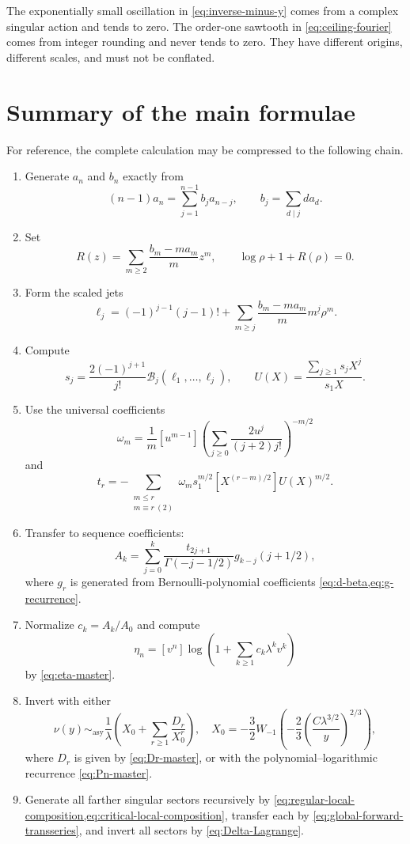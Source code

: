 \documentclass[11pt,a4paper,oneside,openany]{book}
\theoremstyle{definition}
\theoremstyle{remark}
\newcommand{\Bell}[1]{\mathcal B_{#1}}
\newcommand{\falling}[2]{#1^{\underline{#2}}}
\newcommand{\asympseries}{\sim_{\!\mathrm{asy}}}
\begin{document}
\begin{warningbox}[title={Two distinct oscillatory phenomena}]
The exponentially small oscillation in \cref{eq:inverse-minus-y} comes from a
complex singular action and tends to zero.  The order-one sawtooth in
\cref{eq:ceiling-fourier} comes from integer rounding and never tends to zero.
They have different origins, different scales, and must not be conflated.
\end{warningbox}

\chapter{Summary of the main formulae}
\label{ch:summary}

For reference, the complete calculation may be compressed to the following
chain.

\begin{enumerate}
\item Generate $a_n$ and $b_n$ exactly from
\[
 (n-1)a_n=\sum_{j=1}^{n-1}b_ja_{n-j},
 \qquad b_j=\sum_{d\mid j}d a_d.
\]
\item Set
\[
 R(z)=\sum_{m\ge2}\frac{b_m-ma_m}{m}z^m,
 \qquad \log\rho+1+R(\rho)=0.
\]
\item Form the scaled jets
\[
 \ell_j=(-1)^{j-1}(j-1)!+\sum_{m\ge j}
 \frac{b_m-ma_m}{m}\falling mj\rho^m.
\]
\item Compute
\[
 s_j=\frac{2(-1)^{j+1}}{j!}\Bell j(\ell_1,\ldots,\ell_j),
 \qquad U(X)=\frac{\sum_{j\ge1}s_jX^j}{s_1X}.
\]
\item Use the universal coefficients
\[
 \omega_m=\frac1m[u^{m-1}]
 \left(\sum_{j\ge0}\frac{2u^j}{(j+2)j!}\right)^{-m/2}
\]
and
\[
 t_r=-\sum_{\substack{m\le r\\m\equiv r\ (2)}}
 \omega_ms_1^{m/2}[X^{(r-m)/2}]U(X)^{m/2}.
\]
\item Transfer to sequence coefficients:
\[
 A_k=\sum_{j=0}^k
 \frac{t_{2j+1}}{\Gamma(-j-1/2)}
 g_{k-j}(j+1/2),
\]
where $g_r$ is generated from Bernoulli-polynomial coefficients
\cref{eq:d-beta,eq:g-recurrence}.
\item Normalize $c_k=A_k/A_0$ and compute
\[
 \eta_n=[v^n]\log\left(1+\sum_{k\ge1}c_k\lambda^kv^k\right)
\]
by \cref{eq:eta-master}.
\item Invert with either
\[
 \nu(y)\asympseries\frac1\lambda\left(
 X_0+\sum_{r\ge1}\frac{D_r}{X_0^r}\right),
 \quad
 X_0=-\frac32W_{-1}\!\left(-\frac23
 \left(\frac{C\lambda^{3/2}}y\right)^{2/3}\right),
\]
where $D_r$ is given by \cref{eq:Dr-master}, or with the polynomial--logarithmic
recurrence \cref{eq:Pn-master}.
\item Generate all farther singular sectors recursively by
\cref{eq:regular-local-composition,eq:critical-local-composition}, transfer each
by \cref{eq:global-forward-transseries}, and invert all sectors by
\cref{eq:Delta-Lagrange}.
\end{enumerate}
\end{document}
